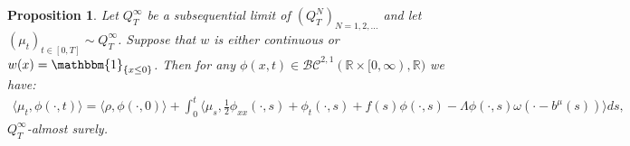 \documentclass{article}
\newtheorem{propn}[theorem]{Proposition}
\newcommand{\B}[1]{\mathbb{#1}}
\newcommand{\C}[1]{\mathcal{#1}}
\newcommand{\is}{\mathbbm{1}}
\begin{document}
\begin{propn} \label{weakRepPropn}
    Let $Q^\infty_T$ be a subsequential limit of $(Q^N_T)_{N=1,2,\ldots}$ and let $(\mu_t)_{t\in[0,T]}\sim Q^\infty_T$. %
    Suppose that $w$ is either continuous or $w(x)=\is_{\{x\leq 0\}}$. Then for any $\phi(x,t)\in \C{BC}^{2,1}(\B{R}\times [0,\infty),\B{R})$ we have:
    \begin{align}\label{convOfWeakRep}\langle \mu_t,\phi(\cdot,t)\rangle = \langle \rho, \phi(\cdot,0)\rangle + \int_0^t \langle \mu_s, \frac12 \phi_{xx}(\cdot,s)+\phi_t(\cdot,s)+f(s)\phi(\cdot,s)-\Lambda\phi(\cdot,s)\omega(\cdot-b^\mu(s))\rangle ds,\end{align}
    $Q^\infty_T$-almost surely.%
\end{propn}
\end{document}

